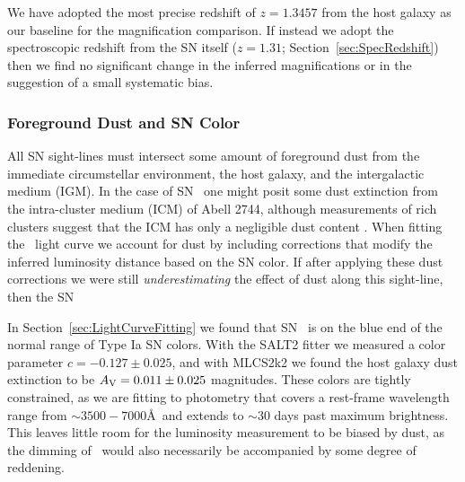 We have adopted the most precise redshift of $z=1.3457$ from
the host galaxy as our baseline for the magnification comparison.  If
instead we adopt the spectroscopic redshift from the SN itself
($z=1.31$; Section~\ref{sec:SpecRedshift}) then we find no significant
change in the inferred magnifications or in the suggestion of a small
systematic bias.


\subsubsection{Foreground Dust and SN Color}
\label{sec:ForegroundDust}

All SN sight-lines must intersect some amount of foreground dust from
the immediate circumstellar environment, the host galaxy, and the
intergalactic medium (IGM). In the case of SN \tomas\ one might posit
some dust extinction from the intra-cluster medium (ICM) of Abell
2744, although measurements of rich clusters suggest that the ICM has
only a negligible dust
content \citep{Maoz:1995,Stickel:2002,Bai:2007}.  When fitting
the \tomas\ light curve we account for dust by including corrections
that modify the inferred luminosity distance based on the SN color.
If after applying these dust corrections we were still {\it
underestimating} the effect of dust along this sight-line, then the SN

In Section~\ref{sec:LightCurveFitting} we found that SN \tomas\ is on
the blue end of the normal range of Type Ia SN colors.  With the SALT2
fitter we measured a color parameter $c=-0.127\pm0.025$, and with
MLCS2k2 we found the host galaxy dust extinction to be $A_{\rm
V}=0.011\pm0.025$ magnitudes.  These colors are tightly constrained,
as we are fitting to photometry that covers a rest-frame wavelength
range from $\sim3500-7000$\AA\ and extends to $\sim$30 days past
maximum brightness.  This leaves little room for the luminosity
measurement to be biased by dust, as the dimming of \tomas\ would also
necessarily be accompanied by some degree of reddening. 

